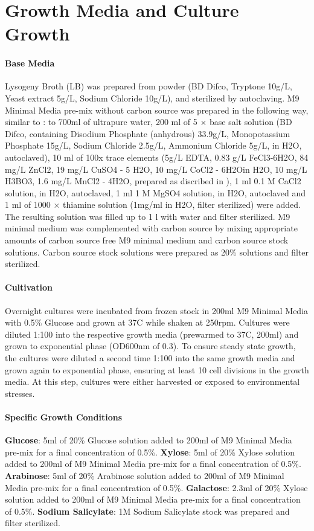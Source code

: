 \section{Growth Media and Culture Growth}
\label{sec:media_and_growth}
\paragraph*{Base Media}
Lysogeny Broth (LB) was prepared from powder (BD Difco, Tryptone 10g/L, Yeast extract 5g/L, Sodium Chloride 10g/L), and sterilized by autoclaving. M9 Minimal Media pre-mix without carbon source was prepared in the following way, similar to \cite{schmidt2016quantitative}: to 700ml of ultrapure water, 200 ml of 5 × base salt solution (BD Difco, containing Disodium Phosphate (anhydrous) 33.9g/L, Monopotassium Phosphate 15g/L, Sodium Chloride 2.5g/L, Ammonium Chloride 5g/L, in H2O, autoclaved), 10 ml of 100x trace elements (5g/L EDTA, 0.83 g/L FeCl3-6H2O, 84 mg/L ZnCl2, 19 mg/L CuSO4 - 5 H2O, 10 mg/L CoCl2 - 6H2Oin H2O, 10 mg/L H3BO3, 1.6 mg/L MnCl2 - 4H2O, prepared as discribed in \cite{flamholz2020functional}), 1 ml 0.1 M CaCl2 solution, in H2O, autoclaved, 1 ml 1 M MgSO4 solution, in H2O, autoclaved and 1 ml of 1000 × thiamine solution (1mg/ml in H2O, filter sterilized) were added. The resulting solution was filled up to 1 l with water and filter sterilized. M9 minimal medium was complemented with carbon source by mixing appropriate amounts of carbon source free M9 minimal medium and carbon source stock solutions. Carbon source stock solutions were prepared as 20\% solutions and filter sterilized.
\paragraph*{Cultivation} Overnight cultures were incubated from frozen stock in 200ml M9 Minimal Media with 0.5\% Glucose and grown at 37C while shaken at 250rpm. Cultures were diluted 1:100 into the respective growth media (prewarmed to 37C, 200ml) and grown to exponential phase (OD600nm of 0.3). To ensure steady state growth, the cultures were diluted a second time 1:100 into the same growth media and grown again to exponential phase, ensuring at least 10 cell divisions in the growth media. At this step, cultures were either harvested or exposed to environmental stresses.
\paragraph*{Specific Growth Conditions}
\textbf{Glucose}: 5ml of 20\% Glucose solution added to 200ml of M9 Minimal Media pre-mix for a final concentration of 0.5\%. \textbf{Xylose}: 5ml of 20\% Xylose solution added to 200ml of M9 Minimal Media pre-mix for a final concentration of 0.5\%. \textbf{Arabinose}: 5ml of 20\% Arabinose solution added to 200ml of M9 Minimal Media pre-mix for a final concentration of 0.5\%. 
\textbf{Galactose}: 2.3ml of 20\% Xylose solution added to 200ml of M9 Minimal Media pre-mix for a final concentration of 0.5\%. 
\textbf{Sodium Salicylate}: 1M Sodium Salicylate stock was prepared  and filter sterilized. 



